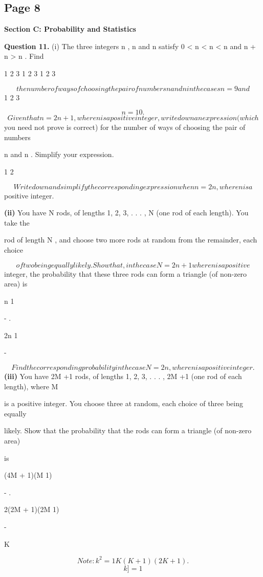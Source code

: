\documentclass[12pt]{article}
\begin{document}
\subsection*{Page 8}
\begin{flushleft}
\bigskip\textbf{Section C: Probability and Statistics}\par
\bigskip\textbf{Question 11.} (i) The three integers n , n and n satisfy 0 < n < n < n and n + n > n . Find\par
1 2 3 1 2 3 1 2 3\par
\[the number of ways of choosing the pair of numbers n and n in the cases n = 9 and\]
1 2 3\par
\[n = 10.\]
\[Given that n = 2n + 1, where n is a positive integer, write down an expression (which\]
you need not prove is correct) for the number of ways of choosing the pair of numbers\par
n and n . Simplify your expression.\par
1 2\par
\[Write down and simplify the corresponding expression when n = 2n , where n is a\]
positive integer.\par
\textbf{(ii)} You have N rods, of lengths 1, 2, 3, . . . , N (one rod of each length). You take the\par
rod of length N , and choose two more rods at random from the remainder, each choice\par
\[of two being equally likely. Show that, in the case N = 2n + 1 where n is a positive\]
integer, the probability that these three rods can form a triangle (of non-zero area) is\par
n 1\par
- .\par
2n 1\par
-\par
\[Find the corresponding probability in the case N = 2n, where n is a positive integer.\]
\textbf{(iii)} You have 2M +1 rods, of lengths 1, 2, 3, . . . , 2M +1 (one rod of each length), where M\par
is a positive integer. You choose three at random, each choice of three being equally\par
likely. Show that the probability that the rods can form a triangle (of non-zero area)\par
is\par
(4M + 1)(M 1)\par
- .\par
2(2M + 1)(2M 1)\par
-\par
K\par
\[Note: k^2 = 1 K(K + 1)(2K + 1).\]
\[k]=1\]
\end{flushleft}
\end{document}
